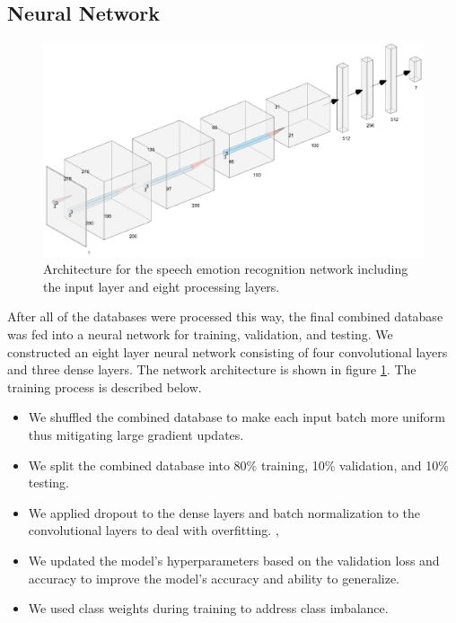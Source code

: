 \documentclass[conference]{IEEEtran}
\begin{document}
\subsection{Neural Network}

\begin{figure}[h!]
	\centering
	\hspace{6mm}
	\includegraphics[width=\textwidth]{neural_network_architecture.png}
	\caption{Architecture for the speech emotion recognition network including the input layer and eight processing layers.}
	\label{neuralNetworkArchitecture}
\end{figure}

After all of the databases were processed this way, the final combined database was fed into a neural network for training, validation, and testing. We constructed an eight layer neural network consisting of four convolutional layers and three dense layers. The network architecture is shown in figure \ref{neuralNetworkArchitecture}. The training process is described below.
\begin{itemize}
	\item We shuffled the combined database to make each input batch more uniform thus mitigating large gradient updates.
	\item We split the combined database into 80\% training, 10\% validation, and 10\% testing.
	\item We applied dropout to the dense layers and batch normalization to the convolutional layers to deal with overfitting. \cite{Srivastava2014}, \cite{Ioffe2015}
	\item We updated the model's hyperparameters based on the validation loss and accuracy to improve the model's accuracy and ability to generalize.
	\item We used class weights during training to address class imbalance.
\end{itemize}
\end{document}
